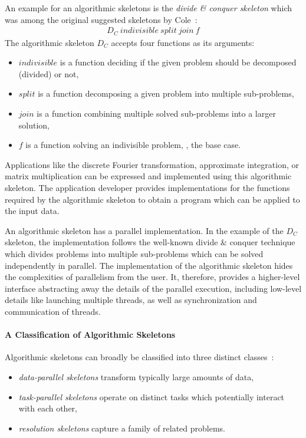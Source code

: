 An example for an algorithmic skeletons is the \emph{divide \& conquer skeleton} which was among the original suggested skeletons by Cole~\cite{Cole1991}:
\begin{align*}
  D_C\ indivisible\ split\ join\ f%
\end{align*}
The algorithmic skeleton $D_C$ accepts four functions as its arguments:
\begin{itemize}
  \item $indivisible$ is a function deciding if the given problem should be decomposed (divided) or not,
  \item $split$ is a function decomposing a given problem into multiple sub-problems,
  \item $join$ is a function combining multiple solved sub-problems into a larger solution,
  \item $f$ is a function solving an indivisible problem, \ie, the base case.
\end{itemize}

Applications like the discrete Fourier transformation, approximate integration, or matrix multiplication can be expressed and implemented using this algorithmic skeleton.
The application developer provides implementations for the functions required by the algorithmic skeleton to obtain a program which can be applied to the input data.

An algorithmic skeleton has a parallel implementation.
In the example of the $D_C$ skeleton, the implementation follows the well-known divide \& conquer technique which divides problems into multiple sub-problems which can be solved independently in parallel.
The implementation of the algorithmic skeleton hides the complexities of parallelism from the user.
It, therefore, provides a higher-level interface abstracting away the details of the parallel execution, including low-level details like launching multiple threads, as well as synchronization and communication of threads.

\paragraph{A Classification of Algorithmic Skeletons}
Algorithmic skeletons can broadly be classified into three distinct classes~\cite{Gonzalez-VelezL10}:
\begin{itemize}
  \item \emph{data-parallel skeletons} transform typically large amounts of data,
  \item \emph{task-parallel skeletons} operate on distinct tasks which potentially interact with each other,
  \item \emph{resolution skeletons} capture a family of related problems.
\end{itemize}

